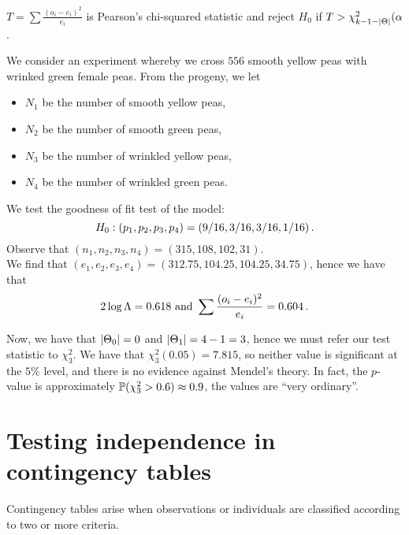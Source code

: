 $T = \sum \frac{(o_i - e_i)^2}{e_i}$ is Pearson's chi-squared statistic and reject $H_0$ if $T > \chi^2_{k-1-\lvert\Theta\rvert}(\alpha$.

\begin{example}[name=Mendel's peas, label=ex:2.4]
We consider an experiment whereby we cross $556$ smooth yellow peas with wrinked green female peas. From the progeny, we let
\begin{itemize}
\item $N_1$ be the number of smooth yellow peas,
\item $N_2$ be the number of smooth green peas,
\item $N_3$ be the number of wrinkled yellow peas,
\item $N_4$ be the number of wrinkled green peas.
\end{itemize}
We test the goodness of fit test of the model:
\[
H_0 : (p_1, p_2, p_3, p_4) = (9/16, 3/16, 3/16, 1/16) \, {.}
\]
Observe that $(n_1, n_2, n_3, n_4) = (315, 108, 102, 31)$. \\
We find that $(e_1, e_2, e_3, e_4) = (312.75, 104.25, 104.25, 34.75)$, hence we have that
\[
2 \log \Lambda = 0.618 \text{ and } \sum \frac{(o_i - e_i)^2}{e_i} = 0.604 \, {.}
\]

Now, we have that $\lvert\Theta_0\rvert = 0$ and $\lvert\Theta_1\rvert = 4 - 1 = 3$, hence we must refer our test statistic to $\chi^2_3$.
We have that $\chi^2_3 (0.05) = 7.815$, so neither value is significant at the $5\%$ level, and there is no evidence against Mendel's theory.
In fact, the $p$-value is approximately $\mathbb{P}(\chi^2_3 > 0.6) \approx 0.9$, the values are ``very ordinary''.
\end{example}

\section{Testing independence in contingency tables\label{sec:2.6}}
Contingency tables arise when observations or individuals are classified according to two or more criteria.

